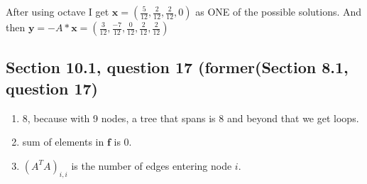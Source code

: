 \documentclass[a4paper,11pt]{article}
\newcommand{\mybf}[1]{\boldsymbol{#1}}
\begin{document}
After using octave I get $\mybf{x} = (\frac{5}{12}, \frac{2}{12}, \frac{2}{12}, 0)$ as ONE of the possible solutions.
And then $\mybf{y}=-A*\mybf{x} = (\frac{3}{12}, \frac{-7}{12}, \frac{0}{12}, \frac{2}{12}, \frac{2}{12})$
\subsection*{Section 10.1, question 17 (former(Section 8.1, question 17)}
\begin{enumerate}[label=\alph*]
\item 8, because with 9 nodes, a tree that spans is 8 and beyond that we get loops.
\item sum of elements in $\mybf{f}$ is 0.
\item $(A^TA)_{i,i}$ is the number of edges entering node $i$.
\end{enumerate}
\end{document}
